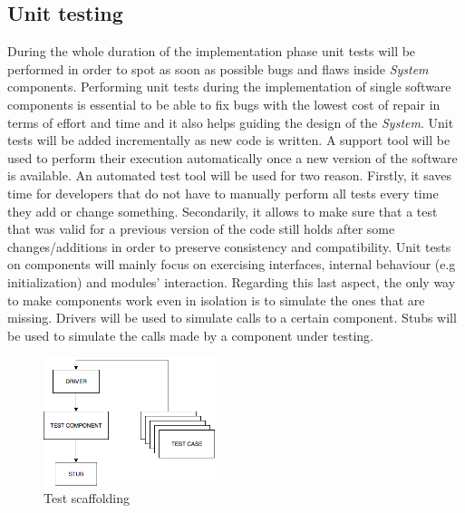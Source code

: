 \documentclass[titlepage]{article}
\begin{document}
\subsection{Unit testing}
During the whole duration of the implementation phase unit tests will be performed in order to spot as soon as possible bugs and flaws inside {\it System} components. Performing unit tests during the implementation of single software components is essential to be able to fix bugs with the lowest cost of repair in terms of effort and time and it also helps guiding the design of the {\it System}.
Unit tests will be added incrementally as new code is written. A support tool will be used to perform their execution automatically once a new version of the software is available. An automated test tool will be used for two reason. Firstly, it saves time for developers that do not have to manually perform all tests every time they add or change something. Secondarily, it allows to make sure that a test that was valid for a previous version of the code still holds after some changes/additions in order to preserve consistency and compatibility.
Unit tests on components will mainly focus on exercising interfaces, internal behaviour (e.g initialization) and modules’ interaction. Regarding this last aspect, the only way to make components work even in isolation is to simulate the ones that are missing. Drivers will be used to simulate calls to a certain component. Stubs will be used to simulate the calls made by a component under testing.
\begin{figure}[H]
	\center
  	\includegraphics[width=5cm]{UnitTest.png}
  	\caption{Test scaffolding}
 	\label{fig:testScaffoling}
\end{figure}
\end{document}
